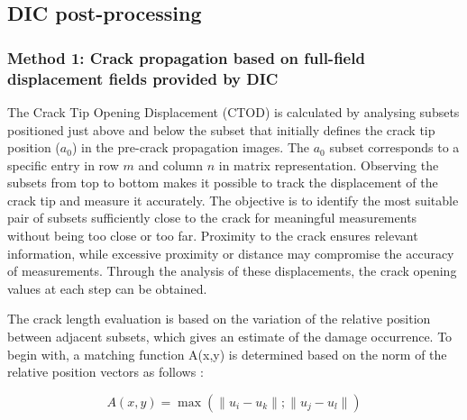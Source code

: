 \documentclass[3p,times,procedia]{elsarticle}
\begin{document}
\subsection{DIC post-processing}

\subsubsection{Method 1: Crack propagation based on full-field displacement fields provided by DIC}

The Crack Tip Opening Displacement (CTOD) is calculated by analysing subsets positioned just above and below the subset that initially defines the crack tip position ($a_0$) in the pre-crack propagation images. The $a_0$ subset corresponds to a specific entry in row $m$ and column $n$ in matrix representation. Observing the subsets from top to bottom makes it possible to track the displacement of the crack tip and measure it accurately. The objective is to identify the most suitable pair of subsets sufficiently close to the crack for meaningful measurements without being too close or too far. Proximity to the crack ensures relevant information, while excessive proximity or distance may compromise the accuracy of measurements. Through the analysis of these displacements, the crack opening values at each step can be obtained.



The crack length evaluation is based on the variation of the relative position between adjacent subsets, which gives an estimate of the damage occurrence. To begin with, a matching function A(x,y) is determined based on the norm of the relative position vectors as follows \citep{Xavieretal2014}:

\vspace{0pt}
\begin{equation}
	A(x,y)=\max(\lVert u_i-u_k\rVert;\lVert u_j-u_l\rVert)
	\label{eq:eq21}
\end{equation}
\end{document}
